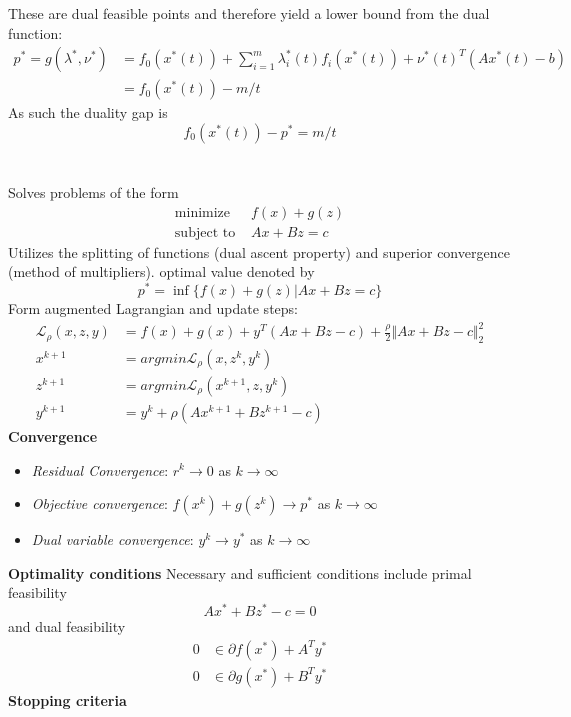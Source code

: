 \documentclass[12pt,a4paper]{report}
\begin{document}
These are dual feasible points and therefore yield a lower bound from the dual function:
\begin{align*}
p^*=g(\lambda^*,\nu^*)&=f_0(x^*(t))+\sum_{i=1}^m\lambda_i^*(t)f_i(x^*(t))+\nu^*(t)^T(Ax^*(t)-b)\\
&=f_0(x^*(t))-m/t
\end{align*}
As such the duality gap is
\begin{equation}
f_0(x^*(t))-p^*=m/t
\end{equation}
\clearpage
{}\\\\
Solves problems of the form
\begin{align*}
\text{minimize }&f(x)+g(z)\\
\text{subject to }&Ax+Bz=c
\end{align*}
Utilizes the splitting of functions (dual ascent property) and superior convergence (method of multipliers). optimal value denoted by
\begin{equation}
p^*=\inf \{f(x)+g(z)|Ax+Bz=c\}
\end{equation}
Form augmented Lagrangian and update steps:
\begin{align*}
\mathcal{L}_{\rho}(x,z,y)&=f(x)+g(x)+y^T(Ax+Bz-c)+\frac{\rho}{2}\Vert Ax+Bz-c\Vert_2^2\\
x^{k+1}&=argmin\mathcal{L}_{\rho}(x,z^k,y^k)\\
z^{k+1}&=argmin\mathcal{L}_{\rho}(x^{k+1},z,y^k)\\
y^{k+1}&=y^k+\rho(Ax^{k+1}+Bz^{k+1}-c)
\end{align*}
\textbf{Convergence}
\begin{itemize}
\item \textit{Residual Convergence}: $r^k\to0$ as $k\to\infty$
\item \textit{Objective convergence}: $f(x^k)+g(z^k)\to p^*$ as $k\to\infty$
\item \textit{Dual variable convergence}: $y^k\to y^*$ as $k\to\infty$
\end{itemize}
\textbf{Optimality conditions}
Necessary and sufficient conditions include primal feasibility
\begin{equation}
Ax^*+Bz^*-c=0
\end{equation}
and dual feasibility
\begin{align*}
0&\in\partial f(x^*)+A^Ty^*\\
0&\in\partial g(x^*)+B^Ty^*
\end{align*}
\textbf{Stopping criteria}
\end{document}
